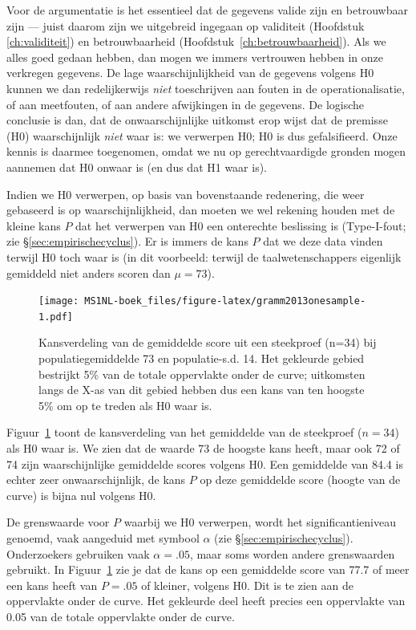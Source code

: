 \documentclass[
]{book}
\begin{document}
Voor de argumentatie is het essentieel dat de gegevens valide zijn en
betrouwbaar zijn --- juist daarom zijn we uitgebreid ingegaan op
validiteit
(Hoofdstuk \ref{ch:validiteit}) en betrouwbaarheid
(Hoofdstuk~\ref{ch:betrouwbaarheid}). Als we alles goed gedaan hebben, dan
mogen we immers vertrouwen hebben in onze verkregen gegevens. De lage
waarschijnlijkheid van de gegevens volgens H0 kunnen we dan
redelijkerwijs \emph{niet} toeschrijven aan fouten in de operationalisatie,
of aan meetfouten, of aan andere afwijkingen in de gegevens. De logische
conclusie is dan, dat de onwaarschijnlijke uitkomst erop wijst dat de
premisse (H0) waarschijnlijk \emph{niet} waar is: we verwerpen H0; H0 is dus
gefalsifieerd. Onze kennis is daarmee toegenomen, omdat we nu op
gerechtvaardigde gronden mogen aannemen dat H0 onwaar is (en dus dat H1
waar is).

Indien we H0 verwerpen, op basis van bovenstaande redenering, die weer
gebaseerd is op waarschijnlijkheid, dan moeten we wel rekening houden
met de kleine kans \(P\) dat het verwerpen van H0 een onterechte
beslissing is (Type-I-fout; zie
§\ref{sec:empirischecyclus}). Er is immers de kans \(P\) dat we deze
data vinden terwijl H0 toch waar is (in dit voorbeeld: terwijl de
taalwetenschappers eigenlijk gemiddeld niet anders scoren dan \(\mu=73\)).

\begin{figure}
\centering
\texttt{[image: MS1NL-boek\_files/figure-latex/gramm2013onesample-1.pdf]}
\caption{\label{fig:gramm2013onesample}Kansverdeling van de gemiddelde score uit een steekproef (n=34) bij populatiegemiddelde 73 en populatie-s.d. 14. Het gekleurde gebied bestrijkt 5\% van de totale oppervlakte onder de curve; uitkomsten langs de X-as van dit gebied hebben dus een kans van ten hoogste 5\% om op te treden als H0 waar is.}
\end{figure}

Figuur~\ref{fig:gramm2013onesample} toont de kansverdeling van het
gemiddelde van de steekproef (\(n=34\)) als H0 waar is. We zien dat de
waarde 73 de hoogste kans heeft, maar ook 72 of 74 zijn waarschijnlijke
gemiddelde scores volgens H0. Een gemiddelde van 84.4 is echter zeer
onwaarschijnlijk, de kans \(P\) op deze gemiddelde score (hoogte van de
curve) is bijna nul volgens H0.

De grenswaarde voor \(P\) waarbij we H0 verwerpen, wordt het
significantieniveau genoemd, vaak aangeduid met symbool \(\alpha\) (zie
§\ref{sec:empirischecyclus}). Onderzoekers gebruiken vaak
\(\alpha=.05\), maar soms worden andere grenswaarden gebruikt. In
Figuur~\ref{fig:gramm2013onesample} zie je dat de kans op een gemiddelde
score van 77.7 of meer een kans heeft van \(P=.05\) of kleiner, volgens
H0. Dit is te zien aan de oppervlakte onder de curve. Het gekleurde deel
heeft precies een oppervlakte van 0.05 van de totale oppervlakte onder
de curve.
\end{document}
